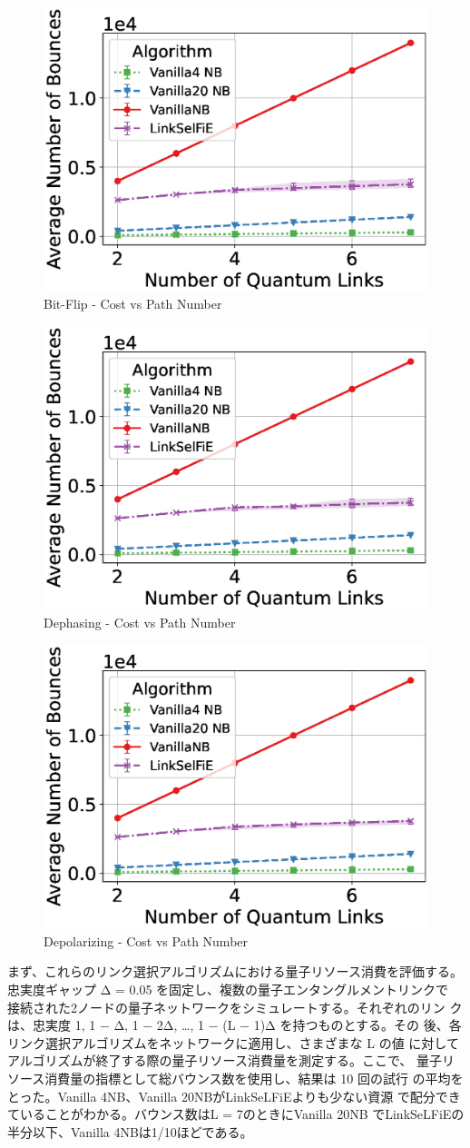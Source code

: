 \documentclass[conference]{IEEEtran}
\begin{document}
\begin{figure}[t]
\centering
\includegraphics[width=0.45\columnwidth]{figure/plot_cost_vs_path_num_BitFlip.eps}
\caption{Bit-Flip - Cost vs Path Number}
\label{fig:cost_bitflip}
\end{figure}

\begin{figure}[t]
\centering
\includegraphics[width=0.45\columnwidth]{figure/plot_cost_vs_path_num_Dephase.eps}
\caption{Dephasing - Cost vs Path Number}
\label{fig:cost_dephase}
\end{figure}

\begin{figure}[t]
\centering
\includegraphics[width=0.45\columnwidth]{figure/plot_cost_vs_path_num_Depolar.eps}
\caption{Depolarizing - Cost vs Path Number}
\label{fig:cost_depolar}
\end{figure}

まず、これらのリンク選択アルゴリズムにおける量子リソース消費を評価する。
忠実度ギャップ Δ = 0.05 を固定し、複数の量子エンタングルメントリンクで
接続された2ノードの量子ネットワークをシミュレートする。それぞれのリン
クは、忠実度 1, 1 − Δ, 1 − 2Δ, …, 1 − (L − 1)Δ を持つものとする。その
後、各リンク選択アルゴリズムをネットワークに適用し、さまざまな L の値
に対してアルゴリズムが終了する際の量子リソース消費量を測定する。ここで、
量子リソース消費量の指標として総バウンス数を使用し、結果は 10 回の試行
の平均をとった。Vanilla 4NB、Vanilla 20NBがLinkSeLFiEよりも少ない資源
で配分できていることがわかる。バウンス数はL = 7のときにVanilla 20NB
でLinkSeLFiEの半分以下、Vanilla 4NBは1/10ほどである。
\end{document}
